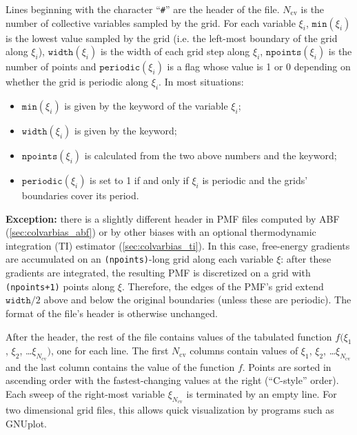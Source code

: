\noindent{}Lines beginning with the character ``\texttt{\#}'' are the header of the file.
$N_{\mathrm{cv}}$ is the number of collective variables sampled by the grid.
For each variable $\xi_{i}$, $\mathtt{min}(\xi_{i})$ is the lowest value sampled by the grid (i.e.{} the left-most boundary of the grid along $\xi_{i}$), $\mathtt{width}(\xi_{i})$ is the width of each grid step along $\xi_{i}$, $\mathtt{npoints}(\xi_{i})$ is the number of points and $\mathtt{periodic}(\xi_{i})$ is a flag whose value is 1 or 0 depending on whether the grid is periodic along $\xi_{i}$.
In most situations:
\begin{itemize}
\item $\mathtt{min}(\xi_{i})$ is given by the  keyword of the variable $\xi_{i}$;
\item $\mathtt{width}(\xi_{i})$ is given by the  keyword;
\item $\mathtt{npoints}(\xi_{i})$ is calculated from the two above numbers and the  keyword;
\item $\mathtt{periodic}(\xi_{i})$ is set to 1 if and only if $\xi_{i}$ is periodic and the grids' boundaries cover its period.
\end{itemize}
\textbf{Exception:} there is a slightly different header in PMF files computed by ABF (\ref{sec:colvarbias_abf}) or by other biases with an optional thermodynamic integration (TI) estimator (\ref{sec:colvarbias_ti}).
In this case, free-energy gradients are accumulated on an \texttt{(npoints)}-long grid along each variable $\xi$: after these gradients are integrated, the resulting PMF is discretized on a grid with \texttt{(npoints+1)} points along $\xi$.
Therefore, the edges of the PMF's grid extend $\mathtt{width}/2$ above and below the original boundaries (unless these are periodic).  The format of the file's header is otherwise unchanged.

After the header, the rest of the file contains values of the tabulated function
$f(\xi_{1}$, $\xi_{2}$, \ldots $\xi_{N_{\mathrm{cv}}})$, one for each line.
The first $N_{\mathrm{cv}}$ columns contain values of $\xi_{1}$, $\xi_{2}$, \ldots $\xi_{N_{\mathrm{cv}}}$ and the last column contains the value of the function $f$.
Points are sorted in ascending order with the fastest-changing values at the right (``C-style'' order).
Each sweep of the right-most variable $\xi_{N_{\mathrm{cv}}}$ is terminated by an empty line.
For two dimensional grid files, this allows quick visualization by programs such as GNUplot.
\\

